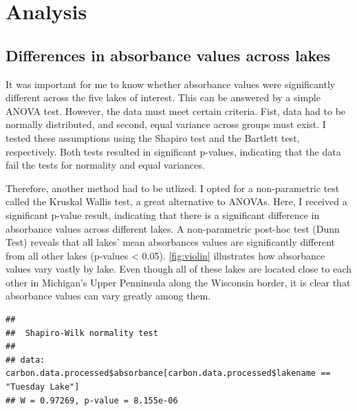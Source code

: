 \documentclass[12pt,]{article}
\newenvironment{Shaded}{\begin{snugshade}}{\end{snugshade}}
\newcommand{\KeywordTok}[1]{\textcolor[rgb]{0.13,0.29,0.53}{\textbf{#1}}}
\newcommand{\StringTok}[1]{\textcolor[rgb]{0.31,0.60,0.02}{#1}}
\newcommand{\CommentTok}[1]{\textcolor[rgb]{0.56,0.35,0.01}{\textit{#1}}}
\newcommand{\OperatorTok}[1]{\textcolor[rgb]{0.81,0.36,0.00}{\textbf{#1}}}
\newcommand{\NormalTok}[1]{#1}
\begin{document}
\newpage

\section{Analysis}\label{analysis}

\subsection{Differences in absorbance values across
lakes}\label{differences-in-absorbance-values-across-lakes}

It was important for me to know whether absorbance values were
significantly different across the five lakes of interest. This can be
answered by a simple ANOVA test. However, the data must meet certain
criteria. Fist, data had to be normally distributed, and second, equal
variance across groups must exist. I tested these assumptions using the
Shapiro test and the Bartlett test, respectively. Both tests resulted in
significant p-values, indicating that the data fail the tests for
normality and equal variances.

Therefore, another method had to be utlized. I opted for a
non-parametric test called the Kruskal Wallis test, a great alternative
to ANOVAs. Here, I received a significant p-value result, indicating
that there is a significant difference in absorbance values across
different lakes. A non-parametric post-hoc test (Dunn Test) reveals that
all lakes' mean absorbances values are significantly different from all
other lakes (p-values \textless{} 0.05). \autoref{fig:violin}
illustrates how absorbance values vary vastly by lake. Even though all
of these lakes are located close to each other in Michigan's Upper
Penninsula along the Wisconsin border, it is clear that absorbance
values can vary greatly among them.

\begin{Shaded}
\end{Shaded}

\begin{verbatim}
## 
##  Shapiro-Wilk normality test
## 
## data:  carbon.data.processed$absorbance[carbon.data.processed$lakename ==     "Tuesday Lake"]
## W = 0.97269, p-value = 8.155e-06
\end{verbatim}
\end{document}
